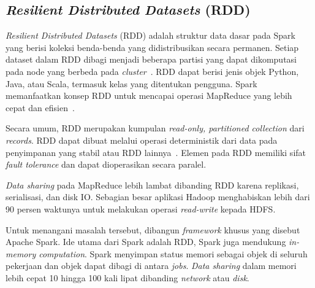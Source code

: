 \subsection{\textit{Resilient Distributed Datasets} (RDD)}

\textit{Resilient Distributed Datasets} (RDD) adalah struktur data dasar pada Spark yang berisi koleksi benda-benda yang didistribusikan secara permanen. Setiap dataset dalam RDD dibagi menjadi beberapa partisi yang dapat dikomputasi pada node yang berbeda pada \textit{cluster}~\cite{holdenkarau:07:ls}. RDD dapat berisi jenis objek Python, Java, atau Scala, termasuk kelas yang ditentukan pengguna. Spark memanfaatkan konsep RDD untuk mencapai operasi MapReduce yang lebih cepat dan efisien~\cite{holdenkarau:07:ls}.

Secara umum, RDD merupakan kumpulan \textit{read-only, partitioned collection} dari \textit{records}. RDD dapat dibuat melalui operasi deterministik dari data pada penyimpanan yang stabil atau RDD lainnya~\cite{holdenkarau:07:ls}. Elemen pada RDD memiliki sifat \textit{fault tolerance} dan dapat dioperasikan secara paralel.


\textit{Data sharing} pada MapReduce lebih lambat dibanding RDD  karena replikasi, serialisasi, dan disk IO. Sebagian besar aplikasi Hadoop menghabiskan lebih dari 90 persen waktunya untuk melakukan operasi \textit{read-write} kepada HDFS.

Untuk menangani masalah tersebut, dibangun \textit{framework} khusus yang disebut Apache Spark. Ide utama dari Spark adalah RDD, Spark juga mendukung \textit{in-memory computation}. Spark menyimpan status memori sebagai objek di seluruh pekerjaan dan objek dapat dibagi di antara \textit{jobs}. \textit{Data sharing} dalam memori lebih cepat 10 hingga 100 kali lipat dibanding \textit{network} atau \textit{disk}.

